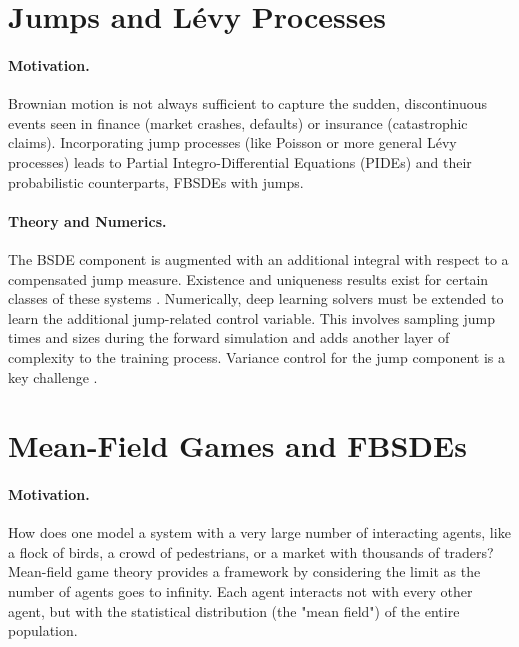 \documentclass[11pt,letterpaper,oneside]{article}
\theoremstyle{plain}
\theoremstyle{definition}
\theoremstyle{remark}
\begin{document}
\section{Jumps and Lévy Processes}
\label{sec:jumps}

\paragraph{Motivation.} Brownian motion is not always sufficient to capture the sudden, discontinuous events seen in finance (market crashes, defaults) or insurance (catastrophic claims). Incorporating jump processes (like Poisson or more general Lévy processes) leads to Partial Integro-Differential Equations (PIDEs) and their probabilistic counterparts, FBSDEs with jumps.

\paragraph{Theory and Numerics.} The BSDE component is augmented with an additional integral with respect to a compensated jump measure. Existence and uniqueness results exist for certain classes of these systems \cite{BarlesBuckdahnPardoux1997}. Numerically, deep learning solvers must be extended to learn the additional jump-related control variable. This involves sampling jump times and sizes during the forward simulation and adds another layer of complexity to the training process. Variance control for the jump component is a key challenge \cite{Bachouch2022}.

\section{Mean-Field Games and FBSDEs}
\label{sec:meanfield}

\paragraph{Motivation.} How does one model a system with a very large number of interacting agents, like a flock of birds, a crowd of pedestrians, or a market with thousands of traders? Mean-field game theory provides a framework by considering the limit as the number of agents goes to infinity. Each agent interacts not with every other agent, but with the statistical distribution (the "mean field") of the entire population.
\end{document}
